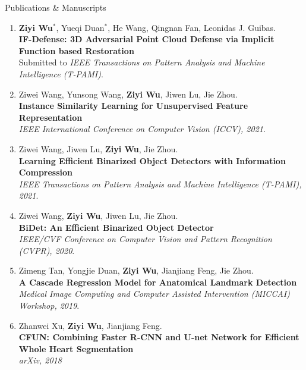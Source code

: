 \documentclass{resume} %
\begin{document}
\begin{rSection}{Publications \& Manuscripts}

\begin{enumerate}
\item \textbf{Ziyi Wu}$^{*}$, Yueqi Duan$^{*}$, He Wang, Qingnan Fan, Leonidas J. Guibas.\\
\textbf{IF-Defense: 3D Adversarial Point Cloud Defense via Implicit Function based Restoration}\\
Submitted to \textit{IEEE Transactions on Pattern Analysis and Machine Intelligence (T-PAMI)}.


\item Ziwei Wang, Yunsong Wang, \textbf{Ziyi Wu}, Jiwen Lu, Jie Zhou.\\
\textbf{Instance Similarity Learning for Unsupervised Feature Representation}\\
\textit{IEEE International Conference on Computer Vision (ICCV), 2021}.


\item Ziwei Wang, Jiwen Lu, \textbf{Ziyi Wu}, Jie Zhou.\\
\textbf{Learning Efficient Binarized Object Detectors with Information Compression}\\
\textit{IEEE Transactions on Pattern Analysis and Machine Intelligence (T-PAMI), 2021}.


\item Ziwei Wang, \textbf{Ziyi Wu}, Jiwen Lu, Jie Zhou.\\
\textbf{BiDet: An Efficient Binarized Object Detector}\\
\textit{IEEE/CVF Conference on Computer Vision and Pattern Recognition (CVPR), 2020}.


\item Zimeng Tan, Yongjie Duan, \textbf{Ziyi Wu}, Jianjiang Feng, Jie Zhou.\\
\textbf{A Cascade Regression Model for Anatomical Landmark Detection}\\
\textit{Medical Image Computing and Computer Assisted Intervention (MICCAI) Workshop, 2019}.


\item Zhanwei Xu, \textbf{Ziyi Wu}, Jianjiang Feng.\\
\textbf{CFUN: Combining Faster R-CNN and U-net Network for Efficient Whole Heart Segmentation}\\
\textit{arXiv, 2018}
\end{enumerate}

\end{rSection}
\end{document}
